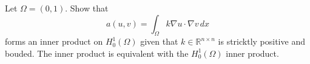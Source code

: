 \begin{exercise}
\label{ex:poincare3}

Let $\Omega=(0,1)$.  
Show that 
\[  
a(u, v) = \int_\Omega k \nabla u \cdot \nabla v \, dx 
\]
forms an inner product on $H^1_0(\Omega)$ given that $k \in \mathbb{R}^{n \times n}$ is stricktly positive
and bouded. The inner product is equivalent with the $H^1_0(\Omega)$ inner product.  


\end{exercise}



